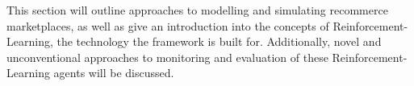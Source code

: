 \begin{jointwork}\label{ch:RelatedWork}
	This section will outline approaches to modelling and simulating recommerce marketplaces, as well as give an introduction into the concepts of Reinforcement-Learning, the technology the framework is built for. Additionally, novel and unconventional approaches to monitoring and evaluation of these Reinforcement-Learning agents will be discussed.
\end{jointwork}